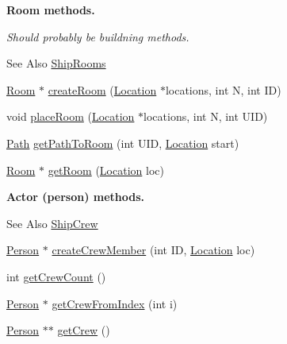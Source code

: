 \begin{Indent}{\bf Room methods.}\par
{\em Should probably be buildning methods. \begin{DoxySeeAlso}{See Also}
\hyperlink{classShipRooms}{Ship\-Rooms} 
\end{DoxySeeAlso}
}\begin{DoxyCompactItemize}
\item 
\hyperlink{classRoom}{Room} $\ast$ \hyperlink{classShipMaster_a8e920cb8c50c68d858d2d90d9b8b377a}{create\-Room} (\hyperlink{structLocation}{Location} $\ast$locations, int N, int I\-D)
\item 
void \hyperlink{classShipMaster_aceb6ebe9dc8112ad8bcec3598b83b0e9}{place\-Room} (\hyperlink{structLocation}{Location} $\ast$locations, int N, int U\-I\-D)
\item 
\hyperlink{classPath}{Path} \hyperlink{classShipMaster_acd0cd7045dc4852607f50c13b3780a94}{get\-Path\-To\-Room} (int U\-I\-D, \hyperlink{structLocation}{Location} start)
\item 
\hyperlink{classRoom}{Room} $\ast$ \hyperlink{classShipMaster_a2418804a9b994f7a3c18b8d2edc77aed}{get\-Room} (\hyperlink{structLocation}{Location} loc)
\end{DoxyCompactItemize}
\end{Indent}
\begin{Indent}{\bf Actor (person) methods.}\par
{\em \begin{DoxySeeAlso}{See Also}
\hyperlink{classShipCrew}{Ship\-Crew} 
\end{DoxySeeAlso}
}\begin{DoxyCompactItemize}
\item 
\hyperlink{classPerson}{Person} $\ast$ \hyperlink{classShipMaster_af1e9d8713eb387b216cc80e11728ce4d}{create\-Crew\-Member} (int I\-D, \hyperlink{structLocation}{Location} loc)
\item 
int \hyperlink{classShipMaster_a49b39499c31975773052fa6c162000ed}{get\-Crew\-Count} ()
\item 
\hyperlink{classPerson}{Person} $\ast$ \hyperlink{classShipMaster_a0fa00005b82784c63799552a3a29bdb0}{get\-Crew\-From\-Index} (int i)
\item 
\hyperlink{classPerson}{Person} $\ast$$\ast$ \hyperlink{classShipMaster_a99b6b1f1035358b6083b3df3c7e52024}{get\-Crew} ()
\end{DoxyCompactItemize}
\end{Indent}
